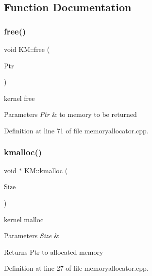 \subsection{Function Documentation}
\mbox{\label{namespace_k_m_a08363437a217255f3f9d2a393a54714b}} 
\subsubsection{\texorpdfstring{free()}{free()}}
{\footnotesize\ttfamily void K\+M\+::free (\begin{DoxyParamCaption}\item[{void $\ast$}]{Ptr }\end{DoxyParamCaption})}



kernel free 


\begin{DoxyParams}{Parameters}
{\em Ptr} & to memory to be returned \\
\hline
\end{DoxyParams}


Definition at line 71 of file memoryallocator.\+cpp.

\mbox{\label{namespace_k_m_aaeb8403b430af6311bb3c1df6ae520b6}} 
\subsubsection{\texorpdfstring{kmalloc()}{kmalloc()}}
{\footnotesize\ttfamily void $\ast$ K\+M\+::kmalloc (\begin{DoxyParamCaption}\item[{size\+\_\+t}]{Size }\end{DoxyParamCaption})}



kernel malloc 


\begin{DoxyParams}{Parameters}
{\em Size} & \\
\hline
\end{DoxyParams}
\begin{DoxyReturn}{Returns}
Ptr to allocated memory 
\end{DoxyReturn}


Definition at line 27 of file memoryallocator.\+cpp.



